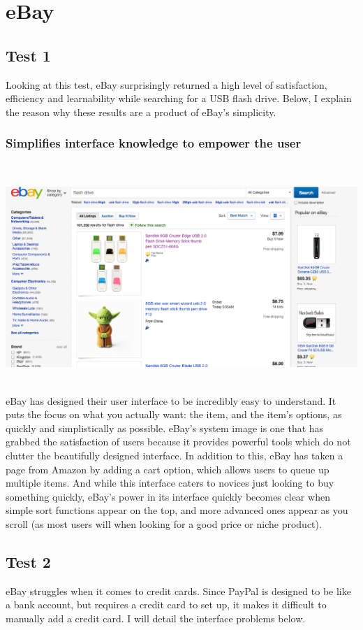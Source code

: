 \documentclass[11pt, oneside]{article}   	%
\begin{document}
\section{eBay}
\subsection{Test 1}
Looking at this test, eBay surprisingly returned a high level of satisfaction, efficiency and learnability while searching for a USB flash drive. Below, I explain the reason why these results are a product of eBay's simplicity.
\subsubsection{Simplifies interface knowledge to empower the user}

\includegraphics[width=6in, height=3.4in]{eBay1}
eBay has designed their user interface to be incredibly easy to understand. It puts the focus on what you actually want: the item, and the item's options, as quickly and simplistically as possible. eBay's system image is one that has grabbed the satisfaction of users because it provides powerful tools which do not clutter the beautifully designed interface. In addition to this, eBay has taken a page from Amazon by adding a cart option, which allows users to queue up multiple items. And while this interface caters to novices just looking to buy something quickly, eBay's power in its interface quickly becomes clear when simple sort functions appear on the top, and more advanced ones appear as you scroll (as most users will when looking for a good price or niche product).

\subsection{Test 2}
eBay struggles when it comes to credit cards. Since PayPal is designed to be like a bank account, but requires a credit card to set up, it makes it difficult to manually add a credit card. I will detail the interface problems below.
\end{document}
